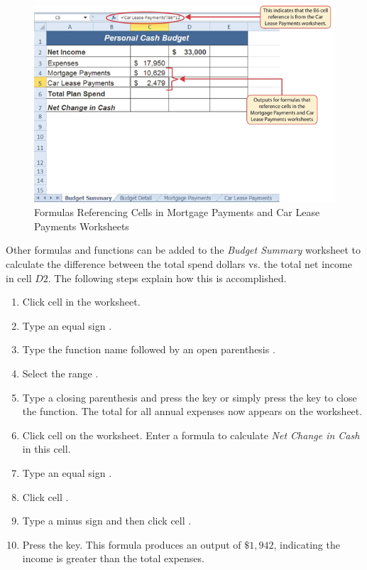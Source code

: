 \begin{figure}[H]
	\centering
	\includegraphics[width=\maxwidth{.95\linewidth}]{gfx/ch02_fig37}
	\caption{Formulas Referencing Cells in Mortgage Payments and Car Lease Payments Worksheets}
	\label{02:fig37}
\end{figure}

Other formulas and functions can be added to the \textit{Budget Summary} worksheet to calculate the difference between the total spend dollars vs. the total net income in cell $ D2 $. The following steps explain how this is accomplished.

\begin{enumerate}
	\item Click cell  in the  worksheet.
	\item Type an equal sign \fmtTyping{=}.
	\item Type the function name  followed by an open parenthesis \fmtTyping{(}.
	\item Select the range .
	\item Type a closing parenthesis \fmtTyping{)} and press the  key or simply press the  key to close the function. The total for all annual expenses now appears on the worksheet.
	\item Click cell  on the  worksheet. Enter a formula to calculate \textit{Net Change in Cash} in this cell.
	\item Type an equal sign \fmtTyping{=}.
	\item Click cell .
	\item Type a minus sign \fmtTyping{-} and then click cell .
	\item Press the  key. This formula produces an output of $ \$1,942 $, indicating the income is greater than the total expenses.
\end{enumerate}

